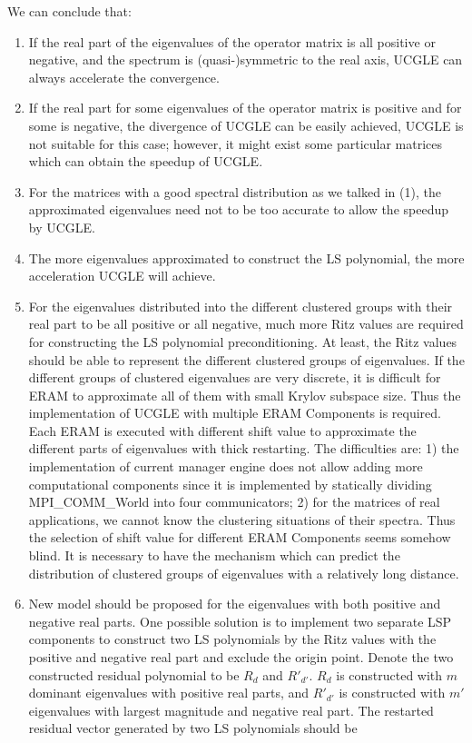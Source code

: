 We can conclude that:

\begin{enumerate}[label=(\arabic*)]
	\item If the real part of the eigenvalues of the operator matrix is all positive or negative, and the spectrum is (quasi-)symmetric to the real axis, UCGLE can always accelerate the convergence.
	
	\item If the real part for some eigenvalues of the operator matrix is positive and for some is negative, the divergence of UCGLE can be easily achieved, UCGLE is not suitable for this case; however, it might exist some particular matrices which can obtain the speedup of UCGLE.
	
	\item For the matrices with a good spectral distribution as we talked in (1), the approximated eigenvalues need not to be too accurate to allow the speedup by UCGLE.
	
	\item The more eigenvalues approximated to construct the LS polynomial, the more acceleration UCGLE will achieve.
	
    \item For the eigenvalues distributed into the different clustered groups with their real part to be all positive or all negative, much more Ritz values are required for constructing the LS polynomial preconditioning. At least, the Ritz values should be able to represent the different clustered groups of eigenvalues. If the different groups of clustered eigenvalues are very discrete, it is difficult for ERAM to approximate all of them with small Krylov subspace size. Thus the implementation of UCGLE with multiple ERAM Components is required. Each ERAM is executed with different shift value to approximate the different parts of eigenvalues with thick restarting. The difficulties are: 1) the implementation of current manager engine does not allow adding more computational components since it is implemented by statically dividing MPI\_COMM\_World into four communicators; 2)  for the matrices of real applications, we cannot know the clustering situations of their spectra. Thus the selection of shift value for different ERAM Components seems somehow blind. It is necessary to have the mechanism which can predict the distribution of clustered groups of eigenvalues with a relatively long distance.
	
    \item New model should be proposed for the eigenvalues with both positive and negative real parts. One possible solution is to implement two separate LSP components to construct two LS polynomials by the Ritz values with the positive and negative real part and exclude the origin point. Denote the two constructed residual polynomial to be $R_{d}$ and $R'_{d'}$. $R_{d}$ is constructed with $m$ dominant eigenvalues with positive real parts, and $R'_{d'}$ is constructed with $m'$ eigenvalues with largest magnitude and negative real part. The restarted residual vector generated by two LS polynomials should be
	

\end{enumerate}
